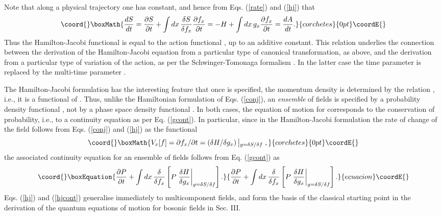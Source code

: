 \documentclass[a4paper,preprint, showpacs, aps, draft]{revtex4}
\begin{document}
{{Note that along a physical trajectory one has \coordHE{} constant, 
and hence from Eqs. (\ref{rate}) and
(\ref{hj}) that  
\[\coord{}\boxMath{
\frac{dS}{dt} = \frac{\partial S}{\partial t} + \int dx\, \frac{\delta
S}{\delta f_x} \frac{\partial f_x}{\partial t} = -H + \int
dx\,g_x\frac{\partial f_x}{\partial t} = \frac{dA}{dt} . }{corchetes}{0pt}\coordE{}\]
Thus the Hamilton-Jacobi functional \coordHE{} is equal to the action
functional \coordHE{}, up to an additive 
constant.  This relation underlies the connection
 between the derivation of the Hamilton-Jacobi equation from a
particular type of canonical transformation, as above, and the
derivation from a particular type of variation of the action, as per the
Schwinger-Tomonaga formalism \cite{wheeler,schwinger}.  In the latter case the
time parameter \coordHE{} is replaced by the multi-time parameter
\myHighlight{$\sigma$}\coordHE{}. 

The Hamilton-Jacobi formulation has the interesting feature that once \coordHE{}
is specified, the momentum density is determined by the relation
\coordHE{}, i.e., it is a functional of \coordHE{}.  Thus, unlike
the Hamiltonian formulation of Eqs. (\ref{conj}), an {\it ensemble} of
fields is specified by a probability density functional \coordHE{}, not by a
phase space density functional \coordHE{}. 
In both cases, the equation of motion for \coordHE{} corresponds to the
conservation of probability, i.e., to a continuity equation as per Eq.
(\ref{gcont}).  In particular, since in the Hamilton-Jacobi formulation
the rate of change of the field \coordHE{} follows from Eqs. (\ref{conj})
and (\ref{hj}) as the functional 
\[\coord{}\boxMath{
V_x[f] = \partial f_x/\partial t = (\delta H/\delta g_x)
\left|{}_{g=\delta S/\delta f}\right. ,}{corchetes}{0pt}\coordE{}\]
the associated continuity equation for an ensemble of fields
follows from Eq. (\ref{gcont}) as  \cite{footnoteb}
\begin{equation}\coord{}\boxEquation{ \label{hjcont}
\frac{\partial P}{\partial t} + \int dx\, \frac{\delta}{\delta f_x}
\left[ P \left. \frac{\delta H}{\delta g_x}\right|_{g=\delta S/\delta f}
\right] . 
}{ \frac{\partial P}{\partial t} + \int dx\, \frac{\delta}{\delta f_x}
\left[ P \left. \frac{\delta H}{\delta g_x}\right|_{g=\delta S/\delta f}
\right] . 
}{ecuacion}\coordE{}\end{equation}
Eqs. (\ref{hj}) and (\ref{hjcont}) generalise immediately to
multicomponent fields, and form the basis of the classical
starting point in the derivation of the quantum equations of motion for
bosonic fields in Sec. III.

}}
\end{document}
